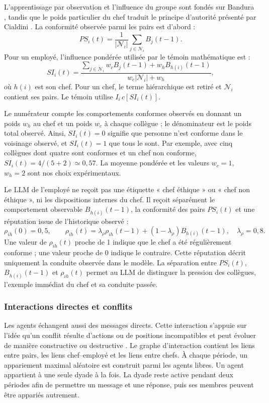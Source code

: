 \documentclass[10pt,a4paper]{article}
\begin{document}
L’apprentissage par observation et l’influence du groupe sont fondés sur
Bandura \cite{bandura1977}, tandis que le poids particulier du chef traduit le
principe d’autorité présenté par Cialdini \cite{cialdini2009}. La conformité
observée parmi les pairs est d’abord :
\[
PS_i(t)=\frac{1}{|\mathcal N_i|}
\sum_{j\in\mathcal N_i}B_j(t-1).
\]
Pour un employé, l’influence pondérée utilisée par le témoin mathématique est :
\[
SI_i(t)=
\frac{\sum_{j\in\mathcal N_i}w_cB_j(t-1)+w_hB_{h(i)}(t-1)}
{w_c|\mathcal N_i|+w_h},
\]
où $h(i)$ est son chef. Pour un chef, le terme hiérarchique est retiré et
$\mathcal N_i$ contient ses pairs. Le témoin utilise
$I_i\,c[SI_i(t)]$.

Le numérateur compte les comportements conformes observés en donnant un poids
$w_h$ au chef et un poids $w_c$ à chaque collègue ; le dénominateur est le poids
total observé. Ainsi, $SI_i(t)=0$ signifie que personne n’est conforme dans le
voisinage observé, et $SI_i(t)=1$ que tous le sont. Par exemple, avec cinq
collègues dont quatre sont conformes et un chef non conforme,
$SI_i(t)=4/(5+2)\simeq0{,}57$. La moyenne pondérée et les valeurs
$w_c=1$, $w_h=2$ sont nos choix expérimentaux.

Le LLM de l’employé ne reçoit pas une étiquette « chef éthique » ou « chef non
éthique », ni les dispositions internes du chef. Il reçoit séparément le
comportement observable $B_{h(i)}(t-1)$, la conformité des pairs $PS_i(t)$ et
une réputation issue de l’historique observé :
\[
\rho_{ih}(0)=0{,}5,\qquad
\rho_{ih}(t)=\lambda_\rho\rho_{ih}(t-1)
+(1-\lambda_\rho)B_{h(i)}(t-1),
\quad \lambda_\rho=0{,}8.
\]
Une valeur de $\rho_{ih}(t)$ proche de 1 indique que le chef a été régulièrement
conforme ; une valeur proche de 0 indique le contraire. Cette réputation décrit
uniquement la conduite observée dans le modèle. La séparation entre
$PS_i(t)$, $B_{h(i)}(t-1)$ et $\rho_{ih}(t)$ permet au LLM de distinguer la
pression des collègues, l’exemple immédiat du chef et sa conduite passée.

\subsubsection{Interactions directes et conflits}

Les agents échangent aussi des messages directs. Cette interaction s’appuie
sur l’idée qu’un conflit résulte d’actions ou de positions incompatibles et
peut évoluer de manière constructive ou destructive \cite{deutsch1973}. Le
graphe d’interaction contient les liens entre pairs, les liens chef--employé et
les liens entre chefs. À chaque période, un appariement maximal aléatoire est
construit parmi les agents libres. Un agent appartient à une seule dyade à la
fois. La dyade reste active pendant deux périodes afin de permettre un message
et une réponse, puis ses membres peuvent être appariés autrement.
\end{document}
